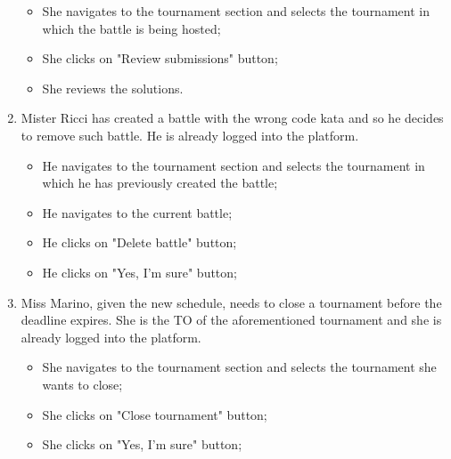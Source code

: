 \documentclass[../RASD.tex]{subfiles}
\begin{document}
\begin{enumerate}
{\begin{itemize}
                \item {She navigates to the tournament section and selects the tournament in which the battle is being hosted;}
                \item {She clicks on "Review submissions" button;}
                \item {She reviews the solutions.}
            \end{itemize}}
            \item {Mister Ricci has created a battle with the wrong code kata and so he decides to remove such battle.
            He is already logged into the platform.
            \begin{itemize}
                \item {He navigates to the tournament section and selects the tournament in which he has previously created the battle;}
                \item {He navigates to the current battle;}
                \item {He clicks on "Delete battle" button;}
                \item {He clicks on "Yes, I'm sure" button;}
            \end{itemize}}
            \item {Miss Marino, given the new schedule, needs to close a tournament before the deadline expires.
            She is the TO of the aforementioned tournament and she is already logged into the platform.
            \begin{itemize}
                \item {She navigates to the tournament section and selects the tournament she wants to close;}
                \item {She clicks on "Close tournament" button;}
                \item {She clicks on "Yes, I'm sure" button;}
            \end{itemize}}
        \end{enumerate}
    \newpage
\end{document}
